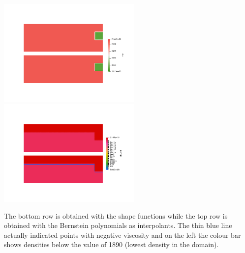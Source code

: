 \begin{center}
\includegraphics[width=7cm]{images/bernstein/qrho.png}
\includegraphics[width=7cm]{images/bernstein/qetaeff.png}
\end{center}
The bottom row is obtained with the shape functions while the top row is obtained with the Bernstein 
polynomials as interpolants. The thin blue line actually indicated points with negative viscosity and 
on the left the colour bar shows densities below the value of 1890 (lowest density in the domain).


 







 

